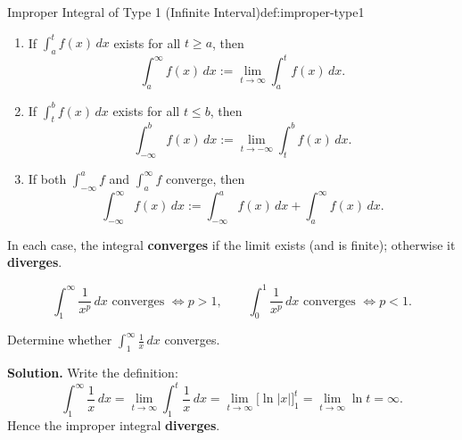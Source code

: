 \begin{definition}{Improper Integral of Type 1 (Infinite Interval)}{def:improper-type1}
\begin{enumerate}[label=(\alph*), leftmargin=*]
\item If $\int_a^t f(x)\,dx$ exists for all $t\ge a$, then
\[
\int_a^\infty f(x)\,dx := \lim_{t\to\infty}\int_a^t f(x)\,dx.
\]
\item If $\int_t^b f(x)\,dx$ exists for all $t\le b$, then
\[
\int_{-\infty}^b f(x)\,dx := \lim_{t\to-\infty}\int_t^b f(x)\,dx.
\]
\item If both $\int_{-\infty}^a f$ and $\int_a^\infty f$ converge, then
\[
\int_{-\infty}^\infty f(x)\,dx := \int_{-\infty}^a f(x)\,dx + \int_a^\infty f(x)\,dx.
\]
\end{enumerate}
In each case, the integral \textbf{converges} if the limit exists (and is finite); otherwise it \textbf{diverges}.
\end{definition}

\begin{keyformula}[title={Key Formula: $p$-integrals (Type 1 and Type 2)}]
\[
\int_1^\infty \frac{1}{x^p}\,dx \text{ converges } \iff p>1,
\qquad
\int_0^1 \frac{1}{x^p}\,dx \text{ converges } \iff p<1.
\]
\end{keyformula}


\begin{center}
\end{center}

\begin{examplebox}[title={Worked Example: Type 1 divergence}]
Determine whether $\displaystyle \int_1^\infty \frac{1}{x}\,dx$ converges.

\textbf{Solution.}
Write the definition:
\[
\int_1^\infty \frac{1}{x}\,dx=\lim_{t\to\infty}\int_1^t \frac{1}{x}\,dx
=\lim_{t\to\infty}\bigl[\ln|x|\bigr]_{1}^{t}
=\lim_{t\to\infty}\ln t=\infty.
\]
Hence the improper integral \textbf{diverges}.
\end{examplebox}

